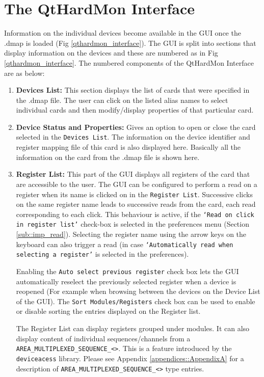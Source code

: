 \section{The QtHardMon Interface} Information on the individual devices become
available in the GUI once the .dmap is loaded (Fig \ref{qthardmon_interface}).
The GUI is split into sections that display information on the devices and these
are numbered as in Fig \ref{qthardmon_interface}. The numbered components of the
QtHardMon Interface are as below: 
\begin{enumerate} 
    \item \textbf{Devices List:}
    This section displays the list of cards that were specified in the
    .dmap file. The user can click on the listed alias names to select
    individual cards and then modify/display properties of that
    particular card. 

	\item \textbf{Device Status and Properties:} Gives an option to open or close
    the card selected in the \texttt{Devices List}. The information on the
    device identifier and register mapping file of this card is also displayed
    here. Basically all the information on the card from the .dmap file is shown
    here. 

	\item \textbf{Register List:} This part of the GUI displays all registers of the
    card that are accessible to the user. The GUI can be configured to perform a
    read on a register when its name is clicked on in the \texttt{Register
    List}. Successive clicks on the same register name leads to successive reads
    from the card, each read corresponding to each click. This behaviour is
    active, if the \texttt{`Read on click in register list'} check-box is
    selected in the preferences menu (Section \ref{sub::imp_read}). Selecting
    the register name using the arrow keys on the keyboard can also trigger a
    read (in case \texttt{`Automatically read when selecting a register'} is
    selected in the preferences).
	
	Enabling the \texttt{Auto select previous register} check box lets the GUI automatically 
	reselect the previously selected register when a device is reopened
	(For example when browsing between the devices on the Device List of the GUI). 
	The \texttt{Sort Modules/Registers} check box can be used to enable or disable sorting 
	the entries displayed on the Register list. 
	
	The Register List can display registers grouped under modules. It can also
	display content of individual sequences/channels from a \texttt{AREA\_MULTIPLEXED\_SEQUENCE\_<>}. 
	This is a feature introduced by the \texttt{deviceacess} library. Please see Appendix \ref{appendices::AppendixA} 
	for a description of \texttt{AREA\_MULTIPLEXED\_SEQUENCE\_<>} type entries.
	

\end{enumerate}
